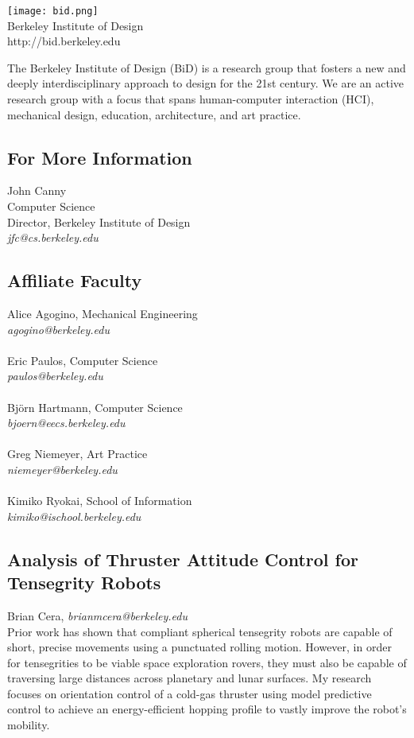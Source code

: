 \documentclass[foldmark,10pt,a4paper,notumble]{leaflet}
\newcommand{\name}[1]{#1,}
\newcommand{\email}[1]{\emph{#1}}
\newcommand{\nowebsite}[1]{\\[3pt]}
\begin{document}
\begin{center}
\texttt{[image: bid.png]}\\
\Large{Berkeley Institute of Design}\\
\large{http://bid.berkeley.edu}\\
\end{center}
The Berkeley Institute of Design (BiD) is a research group that fosters a new and deeply interdisciplinary approach to design for the 21st century.  We are an active research group with a focus that spans human-computer interaction (HCI), mechanical design, education, architecture, and art practice.\\

\subsection{For More Information}
John Canny\\
Computer Science\\
Director, Berkeley Institute of Design\\
\emph{jfc@cs.berkeley.edu}

\subsection{Affiliate Faculty}
Alice Agogino, Mechanical Engineering\\
\emph{agogino@berkeley.edu}\\
\\
Eric Paulos, Computer Science\\
\emph{paulos@berkeley.edu}\\
\\
Bj\"orn Hartmann, Computer Science\\
\emph{bjoern@eecs.berkeley.edu}\\
\\
Greg Niemeyer, Art Practice\\
\emph{niemeyer@berkeley.edu}\\
\\
Kimiko Ryokai, School of Information\\
\emph{kimiko@ischool.berkeley.edu}\\
\newpage
\fontsize{3mm}{3.5mm}\selectfont

\subsection{Analysis of Thruster Attitude Control for Tensegrity Robots}
\name{Brian Cera}
\email{brianmcera@berkeley.edu}
\nowebsite{}
Prior work has shown that compliant spherical tensegrity robots are capable of short, precise movements using a punctuated rolling motion. However, in order for tensegrities to be viable space exploration rovers, they must also be capable of traversing large distances across planetary and lunar surfaces. My research focuses on orientation control of a cold-gas thruster using model predictive control to achieve an energy-efficient hopping profile to vastly improve the robot's mobility.
\end{document}
